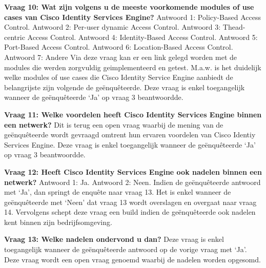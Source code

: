 \begin{itemize}
\newpage
\textbf{Vraag 10: Wat zijn volgens u de meeste voorkomende modules of use cases van Cisco Identity Services Engine?}
\newline
Antwoord 1: Policy-Based Access Control.\newline
Antwoord 2: Per-user dynamic Access Control.\newline
Antwoord 3: Thead-centric Access Control.\newline
Antwoord 4: Identity-Based Access Control.\newline
Antwoord 5: Port-Based Access Control. \newline
Antwoord 6: Location-Based Access Control.\newline
Antwoord 7: Andere \newline \newline
Via deze vraag kan er een link gelegd worden met de modules die werden zorgvuldig geimplementeerd en getest. M.a.w. is het duidelijk welke modules of use cases die Cisco Identity Service Engine aanbiedt de belangrijste zijn volgende de geënquêteerde. Deze vraag is enkel toegangelijk wanneer de geënquêteerde ‘Ja’ op vraag 3 beantwoordde.

\textbf{Vraag 11: Welke voordelen heeft Cisco Identity Services Engine binnen een netwerk?}
\newline
Dit is terug een open vraag waarbij de mening van de geënquêteerde wordt gevraagd omtrent hun ervaren voordelen van Cisco Identiy Services Engine. Deze vraag is enkel toegangelijk wanneer de geënquêteerde ‘Ja’ op vraag 3 beantwoordde.

\textbf{Vraag 12: Heeft Cisco Identity Services Engine ook nadelen binnen een netwerk?}
\newline
Antwoord 1: Ja. \newline
Antwoord 2: Neen. \newline \newline
Indien de geënquêteerde antwoord met ‘Ja’, dan springt de enquête naar vraag 13. Het is enkel wanneer de geënquêteerde met ‘Neen’ dat vraag 13 wordt overslagen en overgaat naar vraag 14. Vervolgens schept deze vraag een build indien de geënquêteerde ook nadelen kent binnen zijn bedrijfsomgeving. 

\textbf{Vraag 13: Welke nadelen ondervond u dan?}
\newline
Deze vraag is enkel toegangelijk wanneer de geënquêteerde antwoord op de vorige vraag met ‘Ja’. Deze vraag wordt een open vraag genoemd waarbij de nadelen worden opgesomd.


\end{itemize}
